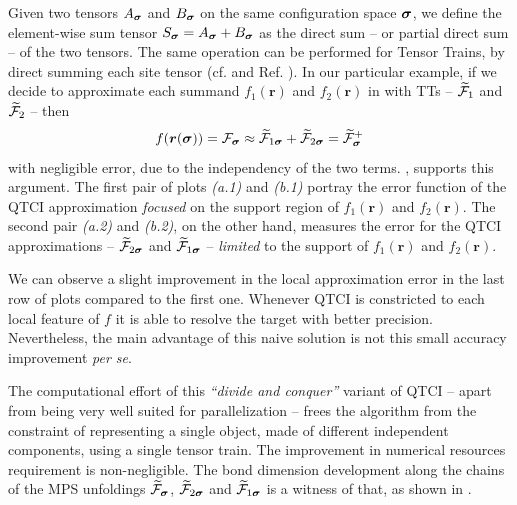 Given two tensors $A_{\boldsymbol{\sigma}}$ and 
$B_{\boldsymbol{\sigma}}$ on the same configuration space $\boldsymbol{\sigma}$, we define the element-wise sum tensor $S_{\boldsymbol{\sigma}} = A_{\boldsymbol{\sigma}} + B_{\boldsymbol{\sigma}}$ as the direct sum -- or partial direct sum -- of the two tensors. The same operation can be performed for Tensor Trains, by direct summing each site tensor (cf.  and Ref. \cite{Lee2018}). 
In our particular example, if we decide to approximate each summand $f_1(\boldsymbol{r})$ and $f_2(\boldsymbol{r})$ in  with TTs -- $\widetilde{\mathcal{F}}_1$ and $\widetilde{\mathcal{F}}_2$ -- then 
\begin{equation}
	f(\boldsymbol{r}(\boldsymbol{\sigma})) = \mathcal{F}_{\boldsymbol{\sigma}} \approx \widetilde{\mathcal{F}}_{1\boldsymbol{\sigma}} + \widetilde{\mathcal{F}}_{2\boldsymbol{\sigma}} = \widetilde{\mathcal{F}}^+_{\boldsymbol{\sigma}}
	\label{eq:localTermsSum}
\end{equation}
with negligible error, due to the independency of the two terms. , supports this argument. The first pair of plots \textit{(a.1)} and \textit{(b.1)} portray the error function of the QTCI approximation \textit{focused} on the support region of $f_1(\boldsymbol{r})$ and $f_2(\boldsymbol{r})$. The second pair \textit{(a.2)} and \textit{(b.2)}, on the other hand, measures the error for the QTCI approximations -- $\widetilde{\mathcal{F}}_{2\boldsymbol{\sigma}}$ and $\widetilde{\mathcal{F}}_{1\boldsymbol{\sigma}}$ -- \textit{limited} \footnotemark to the support of $f_1(\boldsymbol{r})$ and $f_2(\boldsymbol{r})$.


We can observe a slight improvement in the local approximation error in the last row of plots compared to the first one. Whenever QTCI is constricted to each local feature of $f$ it is able to resolve the target with better precision. Nevertheless, the main advantage of this naive solution is not this small accuracy improvement \textit{per se}. 

The computational effort of this \textit{``divide and conquer''} variant of QTCI -- apart from being very well suited for parallelization -- frees the algorithm from the constraint of representing a single object, made of different independent components, using a single tensor train. The improvement in numerical resources requirement is non-negligible. The bond dimension development along the chains of the MPS unfoldings $\widetilde{\mathcal{F}}_{\boldsymbol{\sigma}}$, $\widetilde{\mathcal{F}}_{2\boldsymbol{\sigma}}$ and $\widetilde{\mathcal{F}}_{1\boldsymbol{\sigma}}$ is a witness of that, as shown in . 

